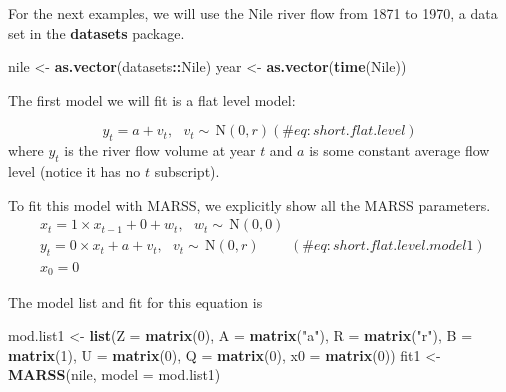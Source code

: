 \documentclass[12pt,]{book}
\newenvironment{Shaded}{\begin{snugshade}}{\end{snugshade}}
\newcommand{\DataTypeTok}[1]{\textcolor[rgb]{0.13,0.29,0.53}{#1}}
\newcommand{\DecValTok}[1]{\textcolor[rgb]{0.00,0.00,0.81}{#1}}
\newcommand{\KeywordTok}[1]{\textcolor[rgb]{0.13,0.29,0.53}{\textbf{#1}}}
\newcommand{\NormalTok}[1]{#1}
\newcommand{\OperatorTok}[1]{\textcolor[rgb]{0.81,0.36,0.00}{\textbf{#1}}}
\newcommand{\StringTok}[1]{\textcolor[rgb]{0.31,0.60,0.02}{#1}}
\begin{document}
For the next examples, we will use the Nile river flow from 1871 to 1970, a data set in the \textbf{datasets} package.

\begin{Shaded}
\begin{Highlighting}[]
\NormalTok{nile <-}\StringTok{ }\KeywordTok{as.vector}\NormalTok{(datasets}\OperatorTok{::}\NormalTok{Nile)}
\NormalTok{year <-}\StringTok{ }\KeywordTok{as.vector}\NormalTok{(}\KeywordTok{time}\NormalTok{(Nile))}
\end{Highlighting}
\end{Shaded}

The first model we will fit is a flat level model:

\begin{equation}
y_t = a+v_t, \text{ } v_t \sim \,\text{N}(0,r)    
(\#eq:short.flat.level)
\end{equation}
where \(y_t\) is the river flow volume at year \(t\) and \(a\) is some constant average flow level (notice it has no \(t\) subscript).

To fit this model with MARSS, we explicitly show all the MARSS parameters.
\begin{equation}
\begin{gathered}
x_t = 1 \times x_{t-1}+ 0 + w_t,    \text{ } w_t \sim \,\text{N}(0,0) \\
y_t = 0 \times x_t + a + v_t, \text{ } v_t \sim \,\text{N}(0,r)  \\
x_0 = 0 
 \end{gathered}   
(\#eq:short.flat.level.model1)
\end{equation}

The model list and fit for this equation is

\begin{Shaded}
\begin{Highlighting}[]
\NormalTok{mod.list1 <-}\StringTok{ }\KeywordTok{list}\NormalTok{(}\DataTypeTok{Z =} \KeywordTok{matrix}\NormalTok{(}\DecValTok{0}\NormalTok{), }\DataTypeTok{A =} \KeywordTok{matrix}\NormalTok{(}\StringTok{"a"}\NormalTok{), }\DataTypeTok{R =} \KeywordTok{matrix}\NormalTok{(}\StringTok{"r"}\NormalTok{), }
    \DataTypeTok{B =} \KeywordTok{matrix}\NormalTok{(}\DecValTok{1}\NormalTok{), }\DataTypeTok{U =} \KeywordTok{matrix}\NormalTok{(}\DecValTok{0}\NormalTok{), }\DataTypeTok{Q =} \KeywordTok{matrix}\NormalTok{(}\DecValTok{0}\NormalTok{), }\DataTypeTok{x0 =} \KeywordTok{matrix}\NormalTok{(}\DecValTok{0}\NormalTok{))}
\NormalTok{fit1 <-}\StringTok{ }\KeywordTok{MARSS}\NormalTok{(nile, }\DataTypeTok{model =}\NormalTok{ mod.list1)}
\end{Highlighting}
\end{Shaded}
\end{document}

